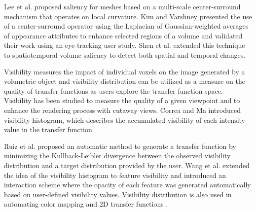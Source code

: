 \documentclass{egpubl}
\begin{document}
Lee et al. \cite{lee_mesh_2005} proposed saliency for meshes based on a multi-scale center-surround mechanism that operates on local curvature. Kim and Varshney \cite{kim_saliency-guided_2006} presented the use of a center-surround operator using the Laplacian of Gaussian-weighted averages of appearance attributes to enhance selected regions of a volume and validated their work using an eye-tracking user study. Shen et al. \cite{shen_spatiotemporal_2015} extended this technique to spatiotemporal volume saliency to detect both spatial and temporal changes.

Visibility measures the impact of individual voxels on the image generated by a volumetric object and visibility distribution can be utilized as a measure on the quality of transfer functions as users explore the transfer function space. Visibility has been studied to measure the quality of a given viewpoint \cite{bordoloi_view_2005} \cite{viola_importance-driven_2004} and to enhance the rendering process with cutaway views.
Correa and Ma \cite{correa_visibility_2011} introduced visibility histogram, which describes the accumulated visibility of each intensity value in the transfer function.

Ruiz et al. \cite{ruiz_automatic_2011} proposed an automatic method to generate a transfer function by minimizing the Kullback-Leibler divergence between the observed visibility distribution and a target distribution provided by the user. Wang et al. \cite{wang_efficient_2011} extended the idea of the visibility histogram to feature visibility and introduced an interaction scheme where the opacity of each feature was generated automatically based on user-defined visibility values. Visibility distribution is also used in automating color mapping \cite{cai_automatic_2013} and 2D transfer functions \cite{qin_voxel_2015}.
\end{document}

